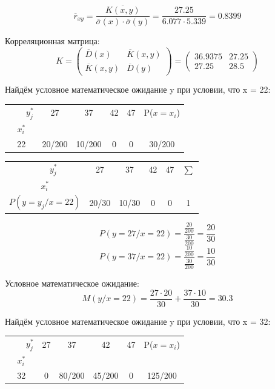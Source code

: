 \documentclass{article}
\begin{document}
\[\overline{r}_{xy} = \frac{\overline{K(x, y)}}{\overline{\sigma}(x)\cdot \overline{\sigma}(y)} = \frac{27.25}{6.077 \cdot 5.339} = 0.8399\]

Корреляционная матрица:
\begin{equation*}
    K =
    \begin{pmatrix}
        \overline{D}(x)& \overline{K}(x, y)\\
        \overline{K}(x, y)& \overline{D}(y)
    \end{pmatrix} = 
    \begin{pmatrix}
        36.9375& 27.25\\
        27.25& 28.5
    \end{pmatrix}
\end{equation*}

Найдём условное математическое ожидание y при условии, что x = 22:

\begin{table}[H]
    \centering
    \begin{tabular}{|c|c|c|c|c|c|}
    \hline
     \ \ \ \ $y_j^*$&  27&  37&  42& 47& P($x=x_i$)\\
    $x_i^*$&  &  &  & &\\
    \hline
    22&  20/200&  10/200&  0& 0& 30/200\\
    \hline
    \end{tabular}
\end{table}

\begin{table}[H]
    \centering
    \begin{tabular}{|c|c|c|c|c|c|}
    \hline
     \ \ \ \ $y_j^*$&  27&  37&  42& 47 & $\sum$\\
    $x_i^*$&  &  &  & &\\
    \hline
    $P(y=y_j / x = 22)$&  20/30&  10/30&  0& 0& 1\\
    \hline
    \end{tabular}
\end{table}

\[P(y=27 / x = 22) = \frac{\frac{20}{200}}{\frac{30}{200}} = \frac{20}{30}\]
\[P(y=37 / x = 22) = \frac{\frac{10}{200}}{\frac{30}{200}} = \frac{10}{30}\]

Условное математическое ожидание:
\[M(y/x=22) = \frac{27\cdot 20}{30} + \frac{37\cdot 10}{30} = 30.3\]

Найдём условное математическое ожидание y при условии, что x = 32:

\begin{table}[H]
    \centering
    \begin{tabular}{|c|c|c|c|c|c|}
    \hline
     \ \ \ \ $y_j^*$&  27&  37&  42& 47& P($x=x_i$)\\
    $x_i^*$&  &  &  & &\\
    \hline
    32&  0&  80/200&  45/200& 0& 125/200\\
    \hline
    \end{tabular}
\end{table}
\end{document}
